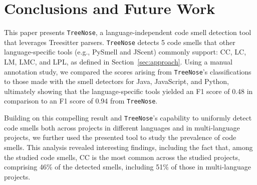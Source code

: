 \section{Conclusions and Future Work}






This paper presents \texttt{TreeNose}, a language-independent code smell
detection tool that leverages Treesitter parsers. \texttt{TreeNose} detects 5
code smells that other language-specific tools (e.g., PySmell and JScent)
commonly support: CC, LC, LM, LMC, and LPL, as defined in
Section~\ref{sec:approach}.
%
Using a manual annotation study, we compared the scores arising from
\texttt{TreeNose}'s classifications to those made with the smell detectors for
Java, JavaScript, and Python,
%
ultimately showing that the language-specific tools yielded an F1 score of 0.48
in comparison to an F1 score of 0.94 from \texttt{TreeNose}.

Building on this compelling result and \texttt{TreeNose}'s capability to
uniformly detect code smells both across projects in different languages
and in multi-language projects, we further used the presented tool to study the
prevalence of code smells.
%
This analysis revealed interesting findings, including the fact that, among the
studied code smells, CC is the most common across the studied projects,
comprising 46\% of the detected smells, including 51\% of those in
multi-language projects.

